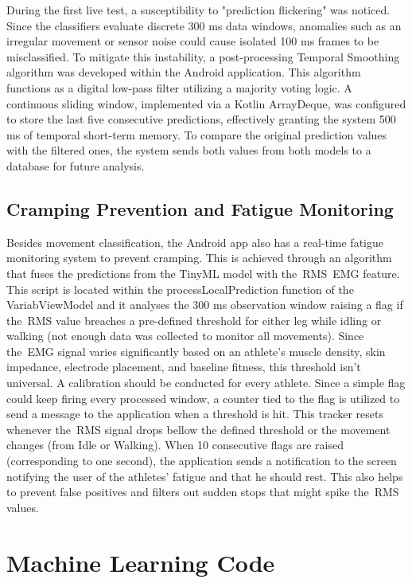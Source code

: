 During the first live test, a susceptibility to "prediction flickering" was noticed. Since the classifiers evaluate discrete 300 ms data windows, anomalies such as an irregular movement or sensor noise could cause 
isolated 100 ms frames to be misclassified. To mitigate this instability, a post-processing Temporal Smoothing algorithm was developed within the Android application. This algorithm functions as a 
digital low-pass filter utilizing a majority voting logic. A continuous sliding window, implemented via a Kotlin ArrayDeque, was configured to store the last five consecutive predictions, effectively granting 
the system 500 ms of temporal short-term memory. 
To compare the original prediction values with the filtered ones, the system sends both values from both models to a database for future analysis.


\subsection{Cramping Prevention and Fatigue Monitoring} 
\label{ssec:cramping_prevention}

Besides movement classification, the Android app also has a real-time fatigue monitoring system to prevent cramping. This is achieved through an algorithm that fuses the predictions from the Tiny\gls{ML} model with the~\gls{RMS}~\gls{EMG} feature.
This script is located within the processLocalPrediction function of the VariabViewModel and it analyses the 300 ms observation window raising a flag if the~\gls{RMS} value breaches a pre-defined threshold for either leg while idling or walking 
(not enough data was collected to monitor all movements). Since the~\gls{EMG} signal varies significantly based on an athlete's muscle density, skin impedance, electrode placement, and baseline fitness, this threshold isn't universal. A calibration 
should be conducted for every athlete. 
Since a simple flag could keep firing every processed window, a counter tied to the flag is utilized to send a message to the application when a threshold is hit. This tracker resets whenever the~\gls{RMS} signal drops bellow the defined threshold 
or the movement changes (from Idle or Walking). When 10 consecutive flags are raised (corresponding to one second), the application sends a notification to the screen notifying the user of the athletes' fatigue and that he should rest. This 
also helps to prevent false positives and filters out sudden stops that might spike the~\gls{RMS} values.


\section{Machine Learning Code}
\label{sec:ml_code}

